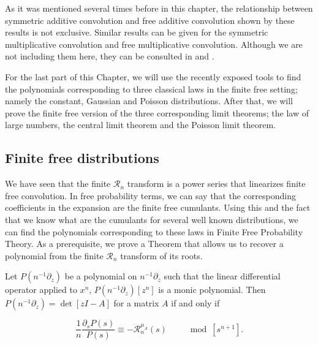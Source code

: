 As it was mentioned several times before in this chapter, the relationship between symmetric additive convolution and free additive convolution shown by these results is not exclusive. Similar results can be given for the symmetric multiplicative convolution and free multiplicative convolution. Although we are not including them here, they can be consulted in \cite{marcus2021polynomial} and \cite{article:finitefree}.

For the last part of this Chapter, we will use the recently exposed tools to find the polynomials corresponding to three classical laws in the finite free setting; namely the constant, Gaussian and Poisson distributions. After that, we will prove the finite free version of the three corresponding limit theorems; the law of large numbers, the central limit theorem and the Poisson limit theorem.

\subsection{Finite free distributions}

We have seen that the finite $\mathcal R_n$ transform is a power series that linearizes finite free convolution. In free probability terms, we can say that the corresponding coefficients in the expansion are the finite free cumulants. Using this and the fact that we know what are the cumulants for several well known distributions, we can find the polynomials corresponding to these laws in Finite Free Probability Theory. As a prerequisite, we prove a Theorem that allows us to recover a polynomial from the finite $\mathcal R_n$ transform of its roots.

\begin{theorem} \label{thm:if_and_only_if}
    Let $P(n^{-1}\partial_z)$ be a polynomial on $n^{-1}\partial_z$ such that the linear differential operator applied to $x^n$, $P(n^{-1}\partial_z)[z^n]$ is a monic polynomial. Then $P(n^{-1}\partial_z) = \det[zI - A]$ for a matrix $A$ if and only if 

    \begin{equation} \label{eq:cauchy_transform_R}
        \frac1n \frac{\partial_s P(s)}{P(s)} \equiv - \mathcal R_n^{\mu_A}(s) \qquad \mod [s^{n+1}].
    \end{equation}
\end{theorem}

